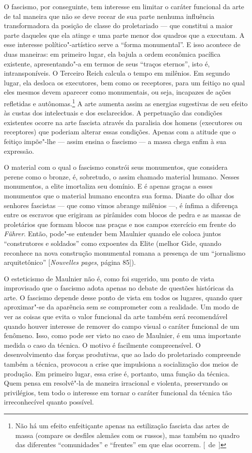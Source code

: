 O fascismo, por conseguinte, tem interesse ​​em limitar o caráter
funcional da arte de tal maneira que não se deve recear de sua parte
nenhuma influência transformadora da posição de classe do proletariado
--- que constitui a maior parte daqueles que ela atinge e uma parte menor
dos quadros que a executam. A esse interesse político"-artístico serve a
``forma monumental''. E isso acontece de duas maneiras: em primeiro
lugar, ela bajula a ordem econômica pacífica existente, apresentando"-a
em termos de seus ``traços eternos'', isto é, intransponíveis. O
Terceiro Reich calcula o tempo em milênios. Em segundo lugar, ela
desloca os executores, bem como os receptores, para um feitiço
no qual eles mesmos devem aparecer como monumentais, ou
seja, incapazes de ações refletidas e autônomas.\footnote{Não há
  um efeito enfeitiçante apenas na estilização fascista das artes de
  massa (compare os desfiles alemães com os russos), mas também no
  quadro das diferentes ``comunidades'' e ``frentes'' em que elas
  ocorrem. [~de~]} A arte aumenta assim as energias sugestivas de seu efeito às
custas dos intelectuais e dos esclarecidos. A perpetuação das condições
existentes ocorre na arte fascista através da paralisia dos homens
(executores ou receptores) que poderiam alterar essas condições. Apenas
com a atitude que o feitiço impõe"-lhe --- assim ensina o fascismo --- a
massa chega enfim à sua expressão.

O material com o qual o fascismo constrói seus monumentos, que considera
perene como o bronze, é, sobretudo, o assim chamado material humano.
Nesses monumentos, a elite imortaliza seu domínio. E é apenas graças a
esses monumentos que o material humano encontra sua forma. Diante do
olhar dos senhores fascistas --- que como vimos abrange milênios ---, é
ínfima a diferença entre os escravos que erigiram as pirâmides com
blocos de pedra e as massas de proletários que formam blocos nas praças
e nos campos exercício em frente do \emph{Führer}. Então, pode"-se
entender bem Maulnier quando ele coloca juntos ``construtores e
soldados'' como expoentes da Elite (melhor Gide, quando reconhece na
nova construção monumental romana a presença de um ``jornalismo
arquitetônico'' {[}\emph{Nouvelles pages}, página 85{]}).

O esteticismo de Maulnier não é, como foi sugerido, um ponto de vista
improvisado que o fascismo adota apenas no debate de questões históricas
da arte. O fascismo depende desse ponto de vista em todos os lugares,
quando quer aproximar"-se da aparência sem se comprometer com a
realidade. Um modo de ver as coisas que evita o valor funcional da arte
também será recomendável quando houver interesse de remover do campo
visual o caráter funcional de um fenômeno. Isso, como pode ser visto no
caso de Maulnier, é em uma importante medida o caso da técnica. O motivo
é facilmente compreensível. O desenvolvimento das forças produtivas, que
ao lado do proletariado compreende também a técnica, provocou a crise
que impulsiona a socialização dos meios de produção. Em primeiro lugar,
essa crise é, portanto, uma função da técnica. Quem pensa em resolvê"-la
de maneira irracional e violenta, preservando os privilégios, tem todo o
interesse em tornar o caráter funcional da técnica tão irreconhecível
quanto possível.

